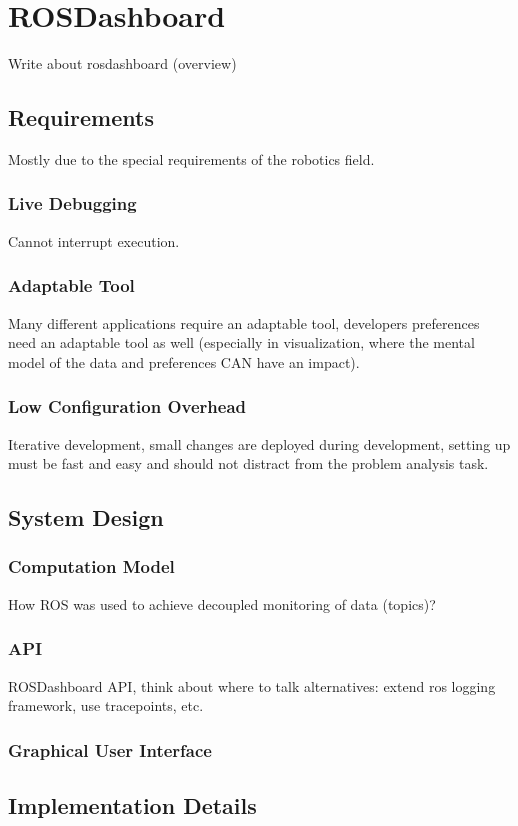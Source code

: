 \chapter{ROSDashboard}

Write about rosdashboard (overview)

\section{Requirements}
Mostly due to the special requirements of the robotics field.
\subsection{Live Debugging}
Cannot interrupt execution.
\subsection{Adaptable Tool}
Many different applications require an adaptable tool, developers preferences need an adaptable tool as well (especially in visualization, where the mental model of the data and preferences CAN have an impact).
\subsection{Low Configuration Overhead}
Iterative development, small changes are deployed during development, setting up must be fast and easy and should not distract from the problem analysis task.

\section{System Design}
\subsection{Computation Model}
How ROS was used to achieve decoupled monitoring of data (topics)?
\subsection{API}
ROSDashboard API, think about where to talk alternatives: extend ros logging framework, use tracepoints, etc.
\subsection{Graphical User Interface}

\section{Implementation Details}
